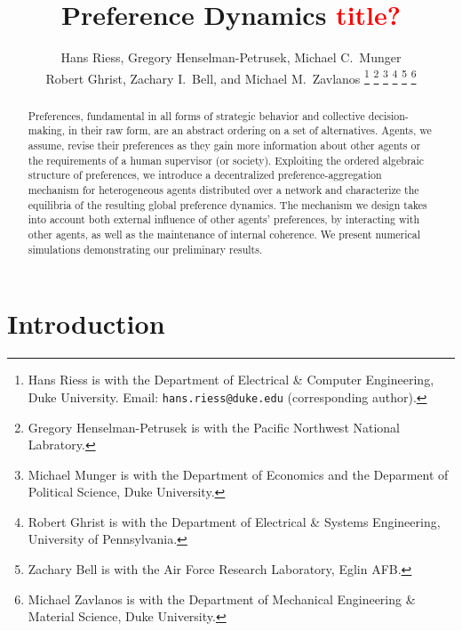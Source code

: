 \documentclass[conference]{ieeeconf}
\begin{document}
\title{\bf Preference Dynamics \textcolor{red}{title?}}

\author{Hans Riess, Gregory Henselman-Petrusek, Michael C.~Munger \\ Robert Ghrist, Zachary I.~Bell, and Michael M.~Zavlanos%
\thanks{Hans Riess is with the Department of Electrical \& Computer Engineering, Duke University. Email: {\tt hans.riess@duke.edu} (corresponding author).}%
\thanks{Gregory Henselman-Petrusek is with the Pacific Northwest National Labratory.}%
\thanks{Michael Munger is with the Department of Economics and the Deparment of Political Science, Duke University.}%
\thanks{Robert Ghrist is with the Department of Electrical \& Systems Engineering, University of Pennsylvania.}%
\thanks{Zachary Bell is with the Air Force Research Laboratory, Eglin AFB.}%
\thanks{Michael Zavlanos is with the Department of Mechanical Engineering \& Material Science, Duke University.}%
}
\maketitle

\begin{abstract}
Preferences, fundamental in all forms of strategic behavior and collective decision-making, in their raw form, are an abstract ordering on a set of alternatives. Agents, we assume, revise their preferences as they gain more information about other agents or the requirements of a human supervisor (or society). Exploiting the ordered algebraic structure of preferences,  we introduce a decentralized preference-aggregation mechanism for heterogeneous agents distributed over a network and characterize the equilibria of the resulting global preference dynamics. The mechanism we design takes into account both external influence of other agents' preferences, by interacting with other agents, as well as the maintenance of internal coherence. We present numerical simulations demonstrating our preliminary results.
\end{abstract}


\section{Introduction}
\end{document}
